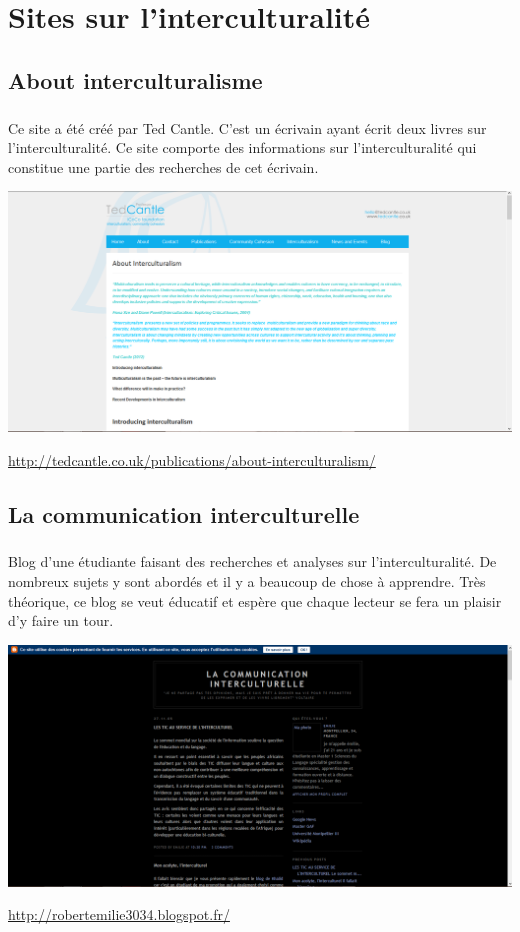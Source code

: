 \chapter[Interculturalité]{Sites sur l'interculturalité}

\section{About interculturalisme}

\paragraph{} Ce site a été créé par Ted Cantle. C'est un écrivain ayant écrit
deux livres sur l'interculturalité. Ce site comporte des informations sur
l'interculturalité  qui constitue une partie des recherches de cet écrivain.

\begin{center}
	\includegraphics[scale=0.25]{interculturality.png}
\end{center}
\url{http://tedcantle.co.uk/publications/about-interculturalism/}

\section{La communication interculturelle}

\paragraph{} Blog d'une étudiante faisant des recherches et analyses sur
l'interculturalité. De nombreux sujets y sont abordés et il y a beaucoup de
chose à apprendre. Très théorique, ce blog se veut éducatif et espère que
chaque lecteur se fera un plaisir d'y faire un tour.

\begin{center}
	\includegraphics[scale=0.25]{ComInter.png}
\end{center}
\url{http://robertemilie3034.blogspot.fr/}

